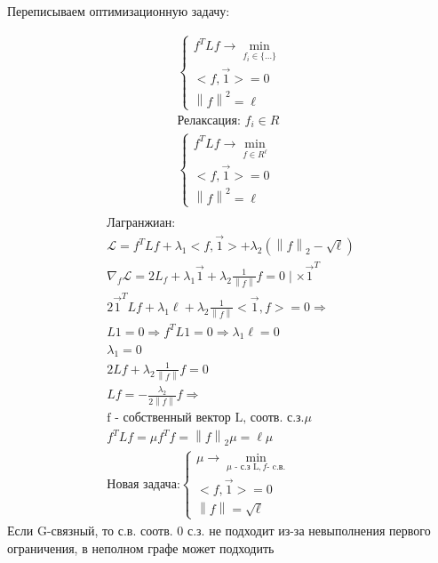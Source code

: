 \documentclass[a4paper, 12pt]{article}
\newcommand\norm[1]{\left\lVert#1\right\rVert}
\begin{document}
Переписываем оптимизационную задачу:

\begin{gather*}
    \begin{cases}
        f^TLf \rightarrow \min_{f_i \in \{\ldots\}} \\
        <f, \vec{1}> = 0 \\
        \norm{f}^2 = \ell
    \end{cases} \\
    \textrm{Релаксация: } f_i \in R \\
    \begin{cases}
        f^TLf \rightarrow \min_{f \in R^{\ell}} \\
        <f, \vec{1}> = 0 \\
        \norm{f}^2 = \ell
    \end{cases} \\
\end{gather*}
\begin{gather*}
    \textrm{Лагранжиан:} \\
    \mathcal{L} = f^TLf + \lambda_1<f, \vec{1}> + 
    \lambda_2(\norm{f}_2 - \sqrt{\ell}) \\
    \nabla_f \mathcal{L} = 2L_f + 
    \lambda_1 \vec{1} +
    \lambda_2 \frac{1}{\norm{f}}f = 0 \mid \times \vec{1}^T \\
    2 \vec{1}^TLf + \lambda_1 \ell + 
    \lambda_2 \frac{1}{\norm{f}}<\vec{1}, f> = 0 \Rightarrow\\
    L1 = 0 \Rightarrow f^TL1 = 0 \Rightarrow \lambda_1 \ell = 0 \\
    \lambda_1 = 0 \\
    2Lf + \lambda_2 \frac{1}{\norm{f}}f = 0 \\
    Lf = -\frac{\lambda_2}{2\norm{f}}f \Rightarrow \\
    \textrm{f - собственный вектор L, соотв. с.з.} \mu \\
    f^TLf = \mu f^Tf = \norm{f}_{2}\mu = \ell \mu \\
    \textrm{Новая задача:}
    \begin{cases}
        \mu \rightarrow \min_{\mu \textrm{ - с.з L}, 
        f \textrm{- c.в.}} \\
        <f, \vec{1}> = 0 \\
        \norm{f} = \sqrt{\ell}
    \end{cases}
\end{gather*}
Если G-связный, то с.в. соотв. 0 с.з. не подходит
из-за невыполнения первого ограничения, в неполном графе
может подходить
\end{document}
